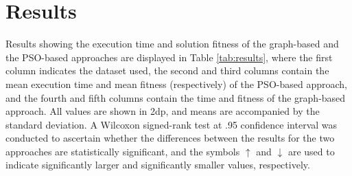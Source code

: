 \documentclass{llncs}
\begin{document}
\section{Results}\label{results}

Results showing the execution time and solution fitness of the graph-based and the PSO-based approaches are displayed in Table \ref{tab:results}, where the first column indicates the dataset used, the second and third columns contain the mean execution time and mean fitness (respectively) of the PSO-based approach, and the fourth and fifth columns contain the time and fitness of the graph-based approach. All values are shown in 2dp, and means are accompanied by the standard deviation. A Wilcoxon signed-rank test at .95 confidence interval was conducted to ascertain whether the differences between the results for the two approaches are statistically significant, and the symbols $\uparrow$ and $\downarrow$ are used to indicate significantly larger and significantly smaller values, respectively. 
\end{document}
